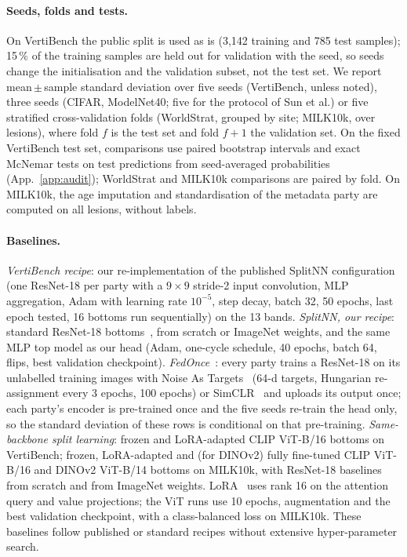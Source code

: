 \paragraph{Seeds, folds and tests.}
On VertiBench the public split is used as is (3{,}142 training and 785 test samples); 15\,\% of the training samples are held out for validation with the seed, so seeds change the initialisation and the validation subset, not the test set. We report mean\,$\pm$\,sample standard deviation over five seeds (VertiBench, unless noted), three seeds (CIFAR, ModelNet40; five for the protocol of Sun et al.) or five stratified cross-validation folds (WorldStrat, grouped by site; MILK10k, over lesions), where fold $f$ is the test set and fold $f{+}1$ the validation set. On the fixed VertiBench test set, comparisons use paired bootstrap intervals and exact McNemar tests on test predictions from seed-averaged probabilities (App.~\ref{app:audit}); WorldStrat and MILK10k comparisons are paired by fold. On MILK10k, the age imputation and standardisation of the metadata party are computed on all lesions, without labels.

\paragraph{Baselines.}
\emph{VertiBench recipe}: our re-implementation of the published SplitNN configuration (one ResNet-18 per party with a $9\times9$ stride-2 input convolution, MLP aggregation, Adam with learning rate $10^{-5}$, step decay, batch 32, 50 epochs, last epoch tested, 16 bottoms run sequentially) on the 13 bands. \emph{SplitNN, our recipe}: standard ResNet-18 bottoms~\cite{he2016resnet}, from scratch or ImageNet weights, and the same MLP top model as our head (Adam, one-cycle schedule, 40 epochs, batch 64, flips, best validation checkpoint). \emph{FedOnce}~\cite{wu2022fedonce}: every party trains a ResNet-18 on its unlabelled training images with Noise As Targets~\cite{bojanowski2017nat} (64-d targets, Hungarian re-assignment every 3 epochs, 100 epochs) or SimCLR~\cite{chen2020simclr} and uploads its output once; each party's encoder is pre-trained once and the five seeds re-train the head only, so the standard deviation of these rows is conditional on that pre-training. \emph{Same-backbone split learning}: frozen and LoRA-adapted CLIP ViT-B/16 bottoms on VertiBench; frozen, LoRA-adapted and (for DINOv2) fully fine-tuned CLIP ViT-B/16 and DINOv2 ViT-B/14 bottoms on MILK10k, with ResNet-18 baselines from scratch and from ImageNet weights. LoRA~\cite{hu2022lora} uses rank 16 on the attention query and value projections; the ViT runs use 10 epochs, augmentation and the best validation checkpoint, with a class-balanced loss on MILK10k. These baselines follow published or standard recipes without extensive hyper-parameter search.
